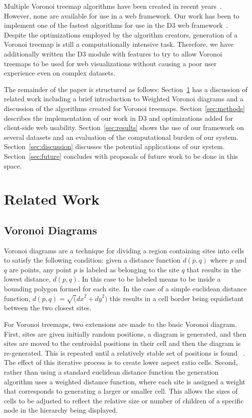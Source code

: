 \documentclass{acm_proc_article-sp} \usepackage{cite}
\begin{document}
Multiple Voronoi treemap algorithms have been created in recent 
years~\cite{balzer:treemaps, sud:fast, nocaj:faster}. However,
none are available for use in a web framework.  Our work has been to
implement one of the fastest algorithms for use in the D3 web
framework~\cite{Bostock2011}. Despite the optimizations employed by the algorithm
creators, generation of a Voronoi treemap is still a computationally
intensive task. Therefore, we have additionally written the D3 module
with features to try to allow Voronoi treemaps to be used for web
visualizations without causing a poor user experience even on complex
datasets.

The remainder of the paper is structured as follows: Section~\ref{sec:related} has a
discussion of related work including a brief introduction to Weighted
Voronoi diagrams and a discussion of the algorithms created for
Voronoi treemaps. Section~\ref{sec:methods} describes the implementation of our work
in D3 and optimizations added for client-side web usability. Section~\ref{sec:results}
shows the use of our framework on several datasets and an evaluation
of the computational burden of our system. Section~\ref{sec:discussion} discusses the
potential applications of our system. Section~\ref{sec:future} concludes with
proposals of future work to be done in this space.

\section{Related Work}
\label{sec:related}

\subsection{Voronoi Diagrams}
Voronoi diagrams are a technique for dividing a region containing
sites into cells to satisfy the following condition: given a distance
function $d(p, q)$ where $p$ and $q$ are points, any point $p$ is
labeled as belonging to the site $q$ that results in the lowest
distance, $d(p,q)$. In this case to be labeled means to be inside a
bounding polygon formed for each site. In the case of a simple
euclidean distance function, $d(p,q) = \sqrt({dx}^2 + {dy}^2)$ this
results in a cell border being equidistant between the two closest
sites.

For Voronoi treemaps, two extensions are made to the basic Voronoi
diagram. First, sites are given initially random positions, a diagram
is generated, and then sites are moved to the centroidal positions in
their cell and then the diagram is re-generated. This is repeated
until a relatively stable set of positions is found ~\cite{lloyd}. The
effect of this iterative process is to create lower aspect ratio
cells. Second, rather than using a standard euclidean distance
function the generation algorithm uses a weighted distance function,
where each site is assigned a weight that corresponds to generating a
larger or smaller cell. This allows the sizes of cells to be adjusted
to reflect the relative size or number of children of a specific node
in the hierarchy being displayed.
\end{document}
